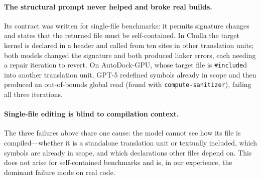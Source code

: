 \paragraph{The structural prompt never helped and broke real builds.}
Its contract was written for single-file benchmarks: it permits signature changes and states that the
returned file must be self-contained. In Cholla the target kernel is declared in a header and called
from ten sites in other translation units; both models changed the signature and both produced linker
errors, each needing a repair iteration to revert. On AutoDock-GPU, whose target file is
\texttt{\#include}d into another translation unit, GPT-5 redefined symbols already in scope and then
produced an out-of-bounds global read (found with \texttt{compute-sanitizer}), failing all three
iterations.

\paragraph{Single-file editing is blind to compilation context.}
The three failures above share one cause: the model cannot see how its file is compiled---whether it is
a standalone translation unit or textually included, which symbols are already in scope, and which
declarations other files depend on. This does not arise for self-contained benchmarks and is, in our
experience, the dominant failure mode on real code.
